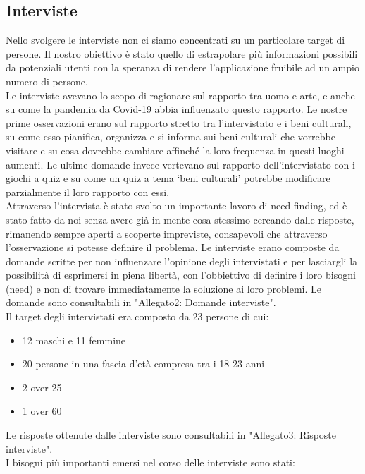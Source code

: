 \documentclass{article}
\begin{document}
\subsection{Interviste}
Nello svolgere le interviste non ci siamo concentrati su un particolare target di persone. Il nostro obiettivo è stato quello di estrapolare più informazioni possibili da potenziali utenti con la speranza di rendere l’applicazione fruibile ad un ampio numero di persone.
\\\indent
Le interviste avevano lo scopo di ragionare sul rapporto tra uomo e arte, e anche su come la pandemia da Covid-19 abbia influenzato questo rapporto. Le nostre prime osservazioni erano sul rapporto stretto tra l’intervistato e i beni culturali, su come esso pianifica, organizza e si informa sui beni culturali che vorrebbe visitare e su cosa dovrebbe cambiare affinché la loro frequenza in questi luoghi aumenti. Le ultime domande invece vertevano sul rapporto dell’intervistato con i giochi a quiz e su come un quiz a tema ‘beni culturali’ potrebbe modificare parzialmente il loro rapporto con essi.
\\\indent
Attraverso l’intervista è stato svolto un importante lavoro di need finding, ed è stato fatto da noi senza avere già in mente cosa stessimo cercando dalle risposte, rimanendo sempre aperti a scoperte impreviste, consapevoli che attraverso l’osservazione si potesse definire il problema. Le interviste erano composte da domande scritte per non influenzare l’opinione degli intervistati e per lasciargli la possibilità di esprimersi in piena libertà, con l’obbiettivo di definire i loro bisogni (need) e non di trovare immediatamente la soluzione ai loro problemi. Le domande sono consultabili in "Allegato2: Domande interviste"\cite{Allegato2}.\\
Il target degli intervistati era composto da 23 persone di cui:
\begin{itemize}
\item 12 maschi e 11 femmine
\item 20 persone in una fascia d’età compresa tra i 18-23 anni
\item 2 over 25
\item 1 over 60
\end{itemize}
Le risposte ottenute dalle interviste sono consultabili in "Allegato3: Risposte interviste"\cite{Allegato3}.\\
I bisogni più importanti emersi nel corso delle interviste sono stati:
\end{document}
